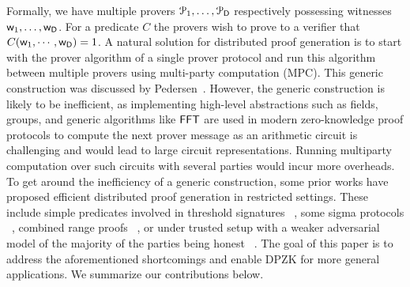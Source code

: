 Formally, we have multiple provers $\mathcal{P}_1, \ldots, \mathcal{P}_{\mathsf{D}}$
respectively possessing witnesses $\mathsf{w}_1, \ldots, \mathsf{w}_{\mathsf{D}}$. For a predicate $C$ the provers wish to prove to a verifier that $C(\mathsf{w}_1,\cdots,\mathsf{w}_{\mathsf{D}}) = 1$.  
A natural solution for distributed
proof generation is to start with the prover algorithm of a single prover
protocol and run this algorithm between multiple provers using multi-party computation (MPC). This generic construction was discussed by Pedersen~\cite{Ped92}. 
 However, the generic construction is likely to be %
inefficient, as implementing high-level abstractions such as fields, groups, and generic algorithms like $\mathsf{FFT}$ are used in modern zero-knowledge proof protocols to compute the next prover message as an
arithmetic circuit is challenging and would lead to large circuit
representations. Running multiparty computation over such circuits with several
parties would incur more overheads.
To get around the inefficiency of a generic construction, some prior works have proposed efficient distributed proof generation in restricted settings. These include simple predicates involved in threshold signatures ~\cite{DDS}, some sigma protocols ~\cite{EfficientTZ}, combined range proofs ~\cite{bulletproofs},
or under trusted setup with a weaker adversarial model of the majority of the parties
being honest ~\cite{trinocchio}. The goal of this paper is to address the aforementioned shortcomings and enable DPZK for more general applications. We summarize our contributions below.
